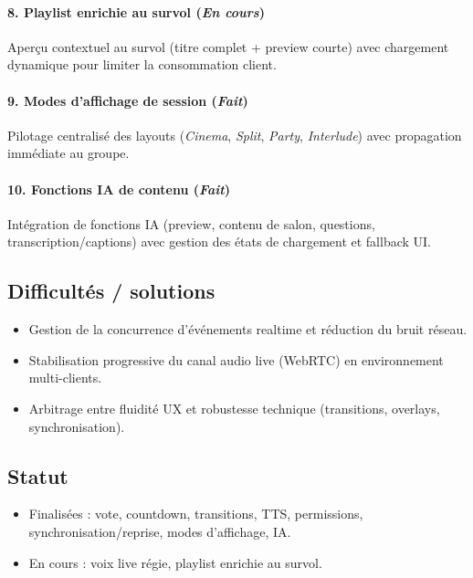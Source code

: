 \documentclass[11pt,a4paper]{report}
\begin{document}
\paragraph{8. Playlist enrichie au survol (\textit{En cours})}
Aperçu contextuel au survol (titre complet + preview courte) avec chargement dynamique pour limiter la consommation client.

\paragraph{9. Modes d'affichage de session (\textit{Fait})}
Pilotage centralisé des layouts (\textit{Cinema}, \textit{Split}, \textit{Party}, \textit{Interlude}) avec propagation immédiate au groupe.

\paragraph{10. Fonctions IA de contenu (\textit{Fait})}
Intégration de fonctions IA (preview, contenu de salon, questions, transcription/captions) avec gestion des états de chargement et fallback UI.
\subsection{Difficultés / solutions}
\begin{itemize}
    \item Gestion de la concurrence d'événements realtime et réduction du bruit réseau.
    \item Stabilisation progressive du canal audio live (WebRTC) en environnement multi-clients.
    \item Arbitrage entre fluidité UX et robustesse technique (transitions, overlays, synchronisation).
\end{itemize}
\subsection{Statut}
\begin{itemize}
    \item Finalisées : vote, countdown, transitions, TTS, permissions, synchronisation/reprise, modes d'affichage, IA.
    \item En cours : voix live régie, playlist enrichie au survol.
\end{itemize}
\end{document}

